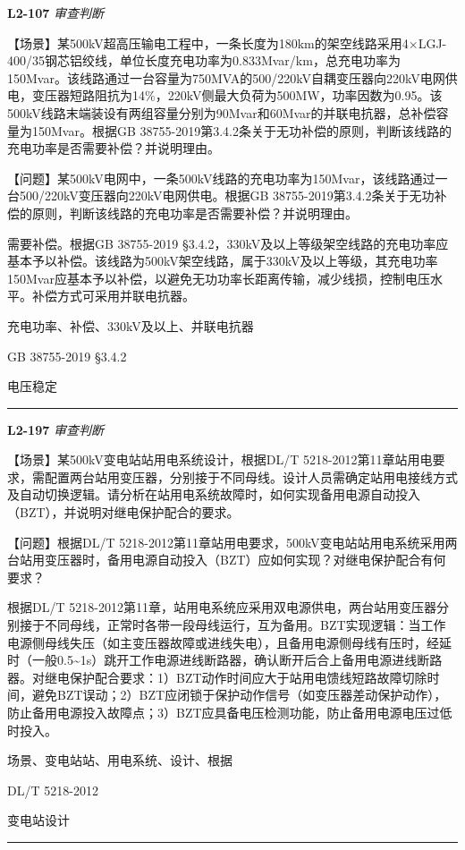\documentclass[12pt,a4paper]{ctexart}
\begin{document}
\noindent\textbf{L2-107} \hfill \textit{审查判断}
\begin{description}[leftmargin=1.5em,style=nextline,font=\normalfont]
  \item[Q:] 【场景】某500kV超高压输电工程中，一条长度为180km的架空线路采用4×LGJ-400/35钢芯铝绞线，单位长度充电功率为0.833Mvar/km，总充电功率为150Mvar。该线路通过一台容量为750MVA的500/220kV自耦变压器向220kV电网供电，变压器短路阻抗为14\%，220kV侧最大负荷为500MW，功率因数为0.95。该500kV线路末端装设有两组容量分别为90Mvar和60Mvar的并联电抗器，总补偿容量为150Mvar。根据GB 38755-2019第3.4.2条关于无功补偿的原则，判断该线路的充电功率是否需要补偿？并说明理由。

【问题】某500kV电网中，一条500kV线路的充电功率为150Mvar，该线路通过一台500/220kV变压器向220kV电网供电。根据GB 38755-2019第3.4.2条关于无功补偿的原则，判断该线路的充电功率是否需要补偿？并说明理由。
  \item[A:] 需要补偿。根据GB 38755-2019 §3.4.2，330kV及以上等级架空线路的充电功率应基本予以补偿。该线路为500kV架空线路，属于330kV及以上等级，其充电功率150Mvar应基本予以补偿，以避免无功功率长距离传输，减少线损，控制电压水平。补偿方式可采用并联电抗器。
  \item[KW:] 充电功率、补偿、330kV及以上、并联电抗器
  \item[Std:] GB 38755-2019 §3.4.2
  \item[Topic:] 电压稳定
\end{description}
\vspace{4pt}
\hrule\vspace{6pt}

\noindent\textbf{L2-197} \hfill \textit{审查判断}
\begin{description}[leftmargin=1.5em,style=nextline,font=\normalfont]
  \item[Q:] 【场景】某500kV变电站站用电系统设计，根据DL/T 5218-2012第11章站用电要求，需配置两台站用变压器，分别接于不同母线。设计人员需确定站用电接线方式及自动切换逻辑。请分析在站用电系统故障时，如何实现备用电源自动投入（BZT），并说明对继电保护配合的要求。

【问题】根据DL/T 5218-2012第11章站用电要求，500kV变电站站用电系统采用两台站用变压器时，备用电源自动投入（BZT）应如何实现？对继电保护配合有何要求？
  \item[A:] 根据DL/T 5218-2012第11章，站用电系统应采用双电源供电，两台站用变压器分别接于不同母线，正常时各带一段母线运行，互为备用。BZT实现逻辑：当工作电源侧母线失压（如主变压器故障或进线失电），且备用电源侧母线有压时，经延时（一般0.5\textasciitilde{}1s）跳开工作电源进线断路器，确认断开后合上备用电源进线断路器。对继电保护配合要求：1）BZT动作时间应大于站用电馈线短路故障切除时间，避免BZT误动；2）BZT应闭锁于保护动作信号（如变压器差动保护动作），防止备用电源投入故障点；3）BZT应具备电压检测功能，防止备用电源电压过低时投入。
  \item[KW:] 场景、变电站站、用电系统、设计、根据
  \item[Std:] DL/T 5218-2012
  \item[Topic:] 变电站设计
\end{description}
\vspace{4pt}
\hrule\vspace{6pt}
\end{document}
